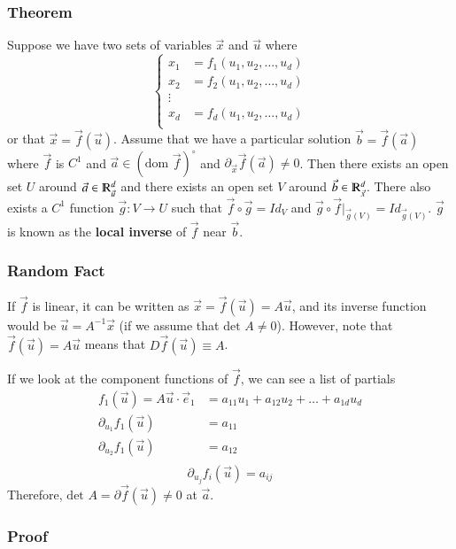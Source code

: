 \documentclass [12 pt, twoside] {book}
\newcommand\+{\text{ }}
\newcommand{\det}{\text{det }}
\newcommand{\dom}{\text{dom }}
\begin{document}
\subsubsection{Theorem}
Suppose we have two sets of variables $\vec{x}$ and $\vec{u}$ where
\[
    \begin{cases}
        x_1 &= f_1 (u_1, u_2, \dots, u_d) \\
        x_2 &= f_2 (u_1, u_2, \dots, u_d) \\
        \vdots & \\
        x_d &= f_d (u_1, u_2, \dots, u_d)\\
    \end{cases}
\]
or that $\vec{x} = \vec{f}(\vec{u})$. Assume that we have a particular solution
$\vec{b} = \vec{f}(\vec{a})$ where $\vec{f}$ is $C^1$ and $\vec{a} \in (\dom
\vec{f})^\circ$ and $\partial_{\vec{x}} \vec{f}(\vec{a}) \neq 0$. Then there exists an open set $U$ around $\vec{a} \in
\varmathbb{R}^d_{\vec{u}}$ and there exists an open set $V$ around $\vec{b} \in
\varmathbb{R}^d_{\vec{x}}$. There also exists a $C^1$ function $\vec{g}: V \to
U$ such that $\vec{f} \circ \vec{g} = Id_V$ and $\vec{g} \circ
\vec{f}|_{\vec{g}(V)} = Id_{\vec{g}(V)}$. $\vec{g}$ is known as the \textbf{local inverse}
of $\vec{f}$ near $\vec{b}$.

\subsubsection{Random Fact}

If $\vec{f}$ is linear, it can be written as $\vec{x} = \vec{f}(\vec{u}) =
A\vec{u}$, and its inverse function would be $\vec{u} = A^{-1}\vec{x}$ (if we
assume that $\det A \neq 0$). However, note that $\vec{f}(\vec{u}) = A\vec{u}$
means that $D\vec{f}(\vec{u}) \equiv A$.

If we look at the component functions of $\vec{f}$, we can see a list of
partials
\begin{align*}
    f_1(\vec{u}) = A\vec{u} \cdot \vec{e}_1 &= a_{11}u_1 + a_{12}u_2 + \dots + a_{1d}u_d\\
    \partial_{u_1}f_1(\vec{u}) &= a_{11}\\
    \partial_{u_2}f_1(\vec{u}) &= a_{12}\\
\end{align*}
\[
    \boxed{\partial_{u_j} f_i (\vec{u}) = a_{ij}}
\]
Therefore, $\det A = \partial \vec{f}(\vec{u}) \neq 0$ at $\vec{a}$.

\subsubsection{Proof}
\end{document}
